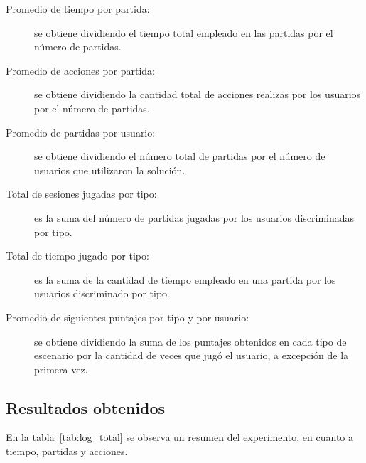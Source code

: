 \begin{description}
\item[Promedio de tiempo por partida:] se obtiene dividiendo el tiempo total empleado 
    en las partidas por el número de partidas.
\item[Promedio de acciones por partida:] se obtiene dividiendo la cantidad total de 
    acciones realizas por los usuarios por el número de partidas.
\item[Promedio de partidas por usuario:] se obtiene dividiendo el número total de partidas
    por el número de usuarios que utilizaron la solución.
\item[Total de sesiones jugadas por tipo:] es la suma del número de partidas jugadas por los 
    usuarios discriminadas por tipo.
\item[Total de tiempo jugado por tipo:] es la suma de la cantidad de tiempo empleado en una 
    partida por los usuarios discriminado por tipo.
\item[Promedio de siguientes puntajes por tipo y por usuario:] se obtiene dividiendo la suma 
    de los puntajes obtenidos en cada tipo de escenario por la cantidad de veces que jugó el 
    usuario, a excepción de la primera vez.
\end{description}


\subsection{Resultados obtenidos}


En la tabla~\ref{tab:log_total} se observa un resumen del experimento, en cuanto a tiempo, partidas y acciones.


